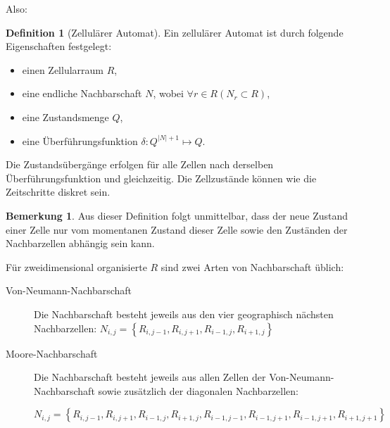 \documentclass[11pt]{article} %
\theoremstyle{definition}
\newtheorem{definition}{Definition}
\newtheorem*{bemerkung}{Bemerkung}
\begin{document}
Also:

\begin{definition}[Zellulärer Automat] Ein zellulärer Automat ist durch folgende Eigenschaften festgelegt:
\begin{itemize}
\item einen Zellularraum $R$,
\item eine endliche Nachbarschaft $N$, wobei $\forall r \in R \left(N_r \subset R\right)$,
\item eine Zustandsmenge $Q$,
\item eine Überführungsfunktion $\delta: Q^{|N| + 1}\mapsto Q$.
\end{itemize}
Die Zustandsübergänge erfolgen für alle Zellen nach derselben Überführungsfunktion und gleichzeitig. Die Zellzustände können wie die Zeitschritte diskret sein. \cite{wiki:zellautomat}

\end{definition}

\begin{bemerkung}
Aus dieser Definition folgt unmittelbar, dass der neue Zustand einer Zelle nur vom momentanen Zustand dieser Zelle sowie den Zuständen der Nachbarzellen abhängig sein kann.
\end{bemerkung}

Für zweidimensional organisierte $R$ sind zwei Arten von Nachbarschaft üblich:
\begin{description}
\item[Von-Neumann-Nachbarschaft] Die Nachbarschaft besteht jeweils aus den vier geographisch nächsten Nachbarzellen: $N_{i,j} = \left\{ R_{i,j-1}, R_{i,j+1}, R_{i-1,j}, R_{i+1,j}\right\}$
\item[Moore-Nachbarschaft] Die Nachbarschaft besteht jeweils aus allen Zellen der Von-Neumann-Nachbarschaft sowie zusätzlich der diagonalen Nachbarzellen:

$N_{i,j} = \left\{ R_{i,j-1}, R_{i,j+1}, R_{i-1,j}, R_{i+1,j},R_{i-1,j-1}, R_{i-1,j+1}, R_{i-1,j+1}, R_{i+1,j+1} \right\}$ \cite{schurr}
\end{description}
\end{document}

